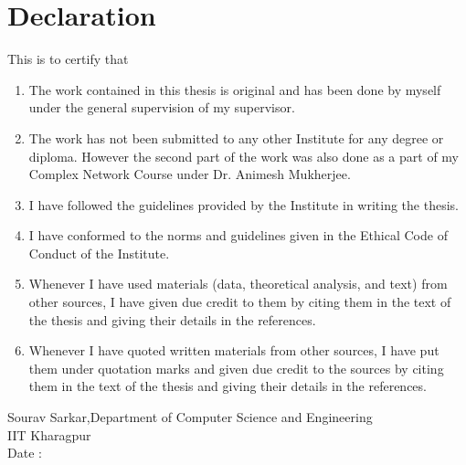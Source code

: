 \documentclass{article}
\begin{document}

\clearpage
\section*{Declaration}

This is to certify that
\begin{enumerate}
\item The work contained in this thesis is original and has been done by myself under the
general supervision of my supervisor.

\item The work has not been submitted to any other Institute for any degree or diploma. However the second part of the work was also done as a part of my Complex Network Course under Dr. Animesh Mukherjee.

\item I have followed the guidelines provided by the Institute in writing the thesis.

\item I have conformed to the norms and guidelines given in the Ethical Code of Conduct
of the Institute.

\item Whenever I have used materials (data, theoretical analysis, and text) from other
sources, I have given due credit to them by citing them in the text of the thesis and
giving their details in the references.

\item Whenever I have quoted written materials from other sources, I have put them under
quotation marks and given due credit to the sources by citing them in the text of
the thesis and giving their details in the references.
\end{enumerate}
\vspace{2cm}
Sourav Sarkar,Department of Computer Science and Engineering\\
IIT Kharagpur\\
Date :\\

\clearpage


\clearpage



\medskip
 


\end{document}
